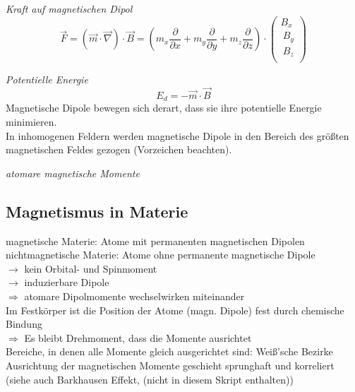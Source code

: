 \documentclass[a4paper,12pt]{report}
\begin{document}
\emph{Kraft auf magnetischen Dipol}
\begin{equation}
\vec{F} = (\vec{m} \cdot \vec{\nabla})\cdot\vec{B} = (m_x\frac{\partial}{\partial x} + m_y\frac{\partial}{\partial y} + m_z\frac{\partial}{\partial z}) \cdot \left( \begin{array}{c} B_x \\\ B_y \\\ B_z \\\ \end{array}\right) 
\end{equation}

\emph{Potentielle Energie}
\begin{equation}
E_d = -\vec{m} \cdot \vec{B}
\end{equation}
Magnetische Dipole bewegen sich derart, dass sie ihre potentielle Energie minimieren.\\
In inhomogenen Feldern werden magnetische Dipole in den Bereich des größten magnetischen Feldes gezogen (Vorzeichen beachten).

\emph{atomare magnetische Momente}

\subsection{Magnetismus in Materie}
magnetische Materie: Atome mit permanenten magnetischen Dipolen\\
nichtmagnetische Materie: Atome ohne permanente magnetische Dipole\\
$\rightarrow$ kein Orbital- und Spinmoment\\
$\rightarrow$ induzierbare Dipole\\

$\Rightarrow$  atomare Dipolmomente wechselwirken miteinander\\
Im Festkörper ist die Position der Atome (magn. Dipole) fest durch chemische Bindung\\
$\Rightarrow$ Es bleibt Drehmoment, dass die Momente ausrichtet\\

Bereiche, in denen alle Momente gleich ausgerichtet sind: Weiß'sche Bezirke\\
Ausrichtung der magnetischen Momente geschieht sprunghaft und korreliert\\
(siehe auch Barkhausen Effekt, (nicht in diesem Skript enthalten))\\
\end{document}
